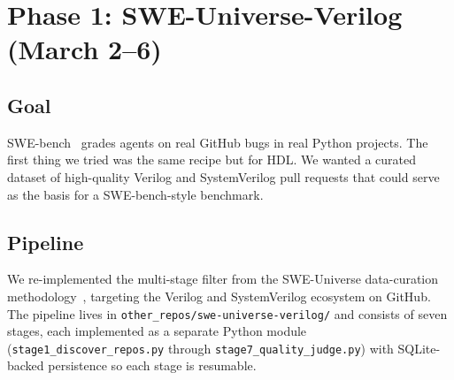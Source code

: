 \documentclass{article}
\begin{document}
\section{Phase 1: SWE-Universe-Verilog (March 2--6)}
\label{sec:sweuv}

\subsection{Goal}

SWE-bench~\citep{swebench} grades agents on real GitHub bugs in real Python projects. The
first thing we tried was the same recipe but for HDL. We wanted a curated dataset of
high-quality Verilog and SystemVerilog pull requests that could serve as the basis for a
SWE-bench-style benchmark.

\subsection{Pipeline}

We re-implemented the multi-stage filter from the SWE-Universe data-curation
methodology~\citep{sweuniverse}, targeting the Verilog and SystemVerilog ecosystem on
GitHub. The pipeline lives in \texttt{other\_repos/swe-universe-verilog/} and consists of
seven stages, each implemented as a separate Python module
(\texttt{stage1\_discover\_repos.py} through \texttt{stage7\_quality\_judge.py}) with
SQLite-backed persistence so each stage is resumable.
\end{document}
